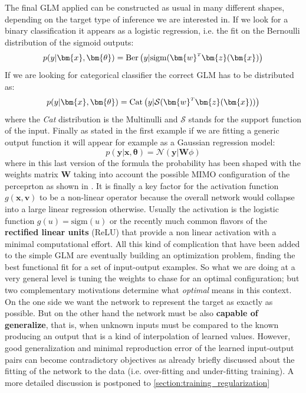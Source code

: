 The final \acl{GLM} applied can be constructed as usual in many different shapes, depending on the target type of inference we are interested in. If we look for a binary classification it appears as a logistic regression, i.e. the fit on the Bernoulli distribution of the sigmoid outputs:
\begin{equation}
    p(y|\bm{x}, \bm{\theta}) = \text{Ber}\left( y|\text{sigm}(\transpose{\bm{w}}\bm{z}(\bm{x}) \right)
\end{equation}
If we are looking for categorical classifier the correct GLM has to be distributed as:
\begin{equation}
    p(y|\bm{x}, \bm{\theta}) = \text{Cat}\left( y|\mathcal{S}(\transpose{\bm{w}}\bm{z}(\bm{x})) \right)
\end{equation}
where the \textit{Cat} distribution is the Multinulli and $\mathcal{S}$ stands for the support function of the input.
Finally as stated in the first example if we are fitting a generic output function it will appear for example as a Gaussian regression model:
\begin{equation}
    p(\bm{y}|\bm{x}, \bm{\theta}) = \mathcal{N}\left( \bm{y}|\bm{W} \phi \right)
\end{equation}
where in this last version of the formula the probability has been shaped with the weights matrix $\bm{W}$ taking into account the possible MIMO configuration of the perceprton as shown in \Figure{\ref{fig:mlp_a}}.
It is finally a key factor for the activation function $g(\bm{x},\bm{v})$ to be a non-linear operator because the overall network would collapse into a large linear regression otherwise. Usually the activation is the logistic function $g(u) = \text{sigm}(u)$ or the recently much common flavors of the \textbf{rectified linear units} (ReLU) that provide a non linear activation with a minimal computational effort.
%
% 
All this kind of complication that have been added to the simple GLM are eventually building an optimization problem, finding the best functional fit for a set of input-output examples. So what we are doing at a very general level is tuning the weights to chase for an optimal configuration; but two complementary motivations determine what \textit{optimal} means in this context. On the one side we want the network to represent the target as exactly as possible. But on the other hand the network must be also \textbf{capable of generalize}, that is, when unknown inputs must be compared to the known producing an output that is a kind of interpolation of learned values. However, good generalization and minimal reproduction error of the learned input-output pairs can become contradictory objectives as already briefly discussed about the fitting of the network to the data (i.e. over-fitting and under-fitting training).
A more detailed discussion is postponed to \cref{section:training_regularization}
%

